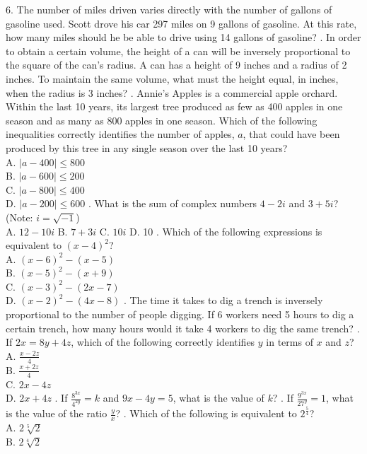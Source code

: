 \documentclass[../satmath.tex]{subfiles}
\begin{document}
6. The number of miles driven varies directly with the number of gallons of gasoline used. Scott drove his car 297 miles on 9 gallons of gasoline.
At this rate, how many miles should he be able to drive using 14 gallons of gasoline?
. In order to obtain a certain volume, the height of a can will be inversely proportional to the square of the can's radius. A can has 
a height of 9 inches and a radius of 2 inches. To maintain the same volume, what must the height equal, in inches, when the radius is 3 inches?
. Annie's Apples is a commercial apple orchard. Within the last 10 years, its largest tree produced as few as 400 apples in one season and as many as 
800 apples in one season. Which of the following inequalities correctly identifies the number of apples, $a$, that could have been produced 
by this tree in any single season over the last 10 years?\\
A. $|a-400|\leq 800$\\
B. $|a-600|\leq 200$\\
C. $|a-800|\leq 400$\\
D. $|a-200|\leq 600$
. What is the sum of complex numbers $4-2i$ and $3+5i$? (Note: $i=\sqrt{-1}$)\\
A. $12-10i$ \quad B. $7+3i$ \quad C. $10i$ \quad D. 10
. Which of the following expressions is equivalent to $(x-4)^2$?\\
A. $(x-6)^2-(x-5)$\\
B. $(x-5)^2-(x+9)$\\
C. $(x-3)^2-(2x-7)$\\
D. $(x-2)^2-(4x-8)$
. The time it takes to dig a trench is inversely proportional to the number of people digging. If 6 workers need 5 hours to dig a certain trench, 
how many hours would it take 4 workers to dig the same trench?
. If $2x=8y+4z$, which of the following correctly identifies $y$ in terms of $x$ and $z$?\\
A. $\frac{x-2z}{4}$\\
B. $\frac{x+2z}{4}$\\
C. $2x-4z$\\
D. $2x+4z$
. If $\frac{8^{3x}}{4^{2y}}=k$ and $9x-4y=5$, what is the value of $k$?
. If $\frac{9^{3x}}{27^y}=1$, what is the value of the ratio $\frac{y}{x}$?
. Which of the following is equivalent to $2^{\frac{5}{4}}$?\\
A. $2\sqrt[5]{2}$\\
B. $2\sqrt[4]{2}$\\
\end{document}
